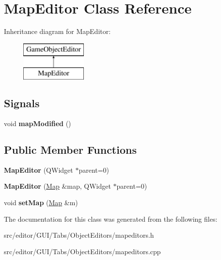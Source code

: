\hypertarget{class_map_editor}{\section{\-Map\-Editor \-Class \-Reference}
\label{class_map_editor}
}
\-Inheritance diagram for \-Map\-Editor\-:\begin{figure}[H]
\begin{center}
\leavevmode
\includegraphics[height=2.000000cm]{class_map_editor}
\end{center}
\end{figure}
\subsection*{\-Signals}
\begin{DoxyCompactItemize}
\item 
\hypertarget{class_map_editor_a6b9ec17c3d4d73b9e7e5a944d81acd9f}{void {\bfseries map\-Modified} ()}\label{class_map_editor_a6b9ec17c3d4d73b9e7e5a944d81acd9f}

\end{DoxyCompactItemize}
\subsection*{\-Public \-Member \-Functions}
\begin{DoxyCompactItemize}
\item 
\hypertarget{class_map_editor_ad30aa4a85a356fef2e41baa6c548a972}{{\bfseries \-Map\-Editor} (\-Q\-Widget $\ast$parent=0)}\label{class_map_editor_ad30aa4a85a356fef2e41baa6c548a972}

\item 
\hypertarget{class_map_editor_a0ee13c368cf79f45e10815e97ffd5c47}{{\bfseries \-Map\-Editor} (\hyperlink{class_map}{\-Map} \&map, \-Q\-Widget $\ast$parent=0)}\label{class_map_editor_a0ee13c368cf79f45e10815e97ffd5c47}

\item 
\hypertarget{class_map_editor_aff674120901fab8e7be3ba92047acdf7}{void {\bfseries set\-Map} (\hyperlink{class_map}{\-Map} \&m)}\label{class_map_editor_aff674120901fab8e7be3ba92047acdf7}

\end{DoxyCompactItemize}


\-The documentation for this class was generated from the following files\-:\begin{DoxyCompactItemize}
\item 
src/editor/\-G\-U\-I/\-Tabs/\-Object\-Editors/mapeditors.\-h\item 
src/editor/\-G\-U\-I/\-Tabs/\-Object\-Editors/mapeditors.\-cpp\end{DoxyCompactItemize}
